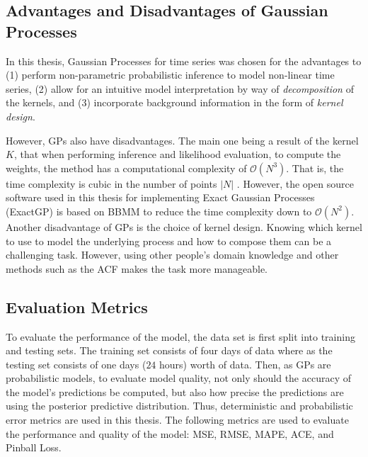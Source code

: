 \subsection{Advantages and Disadvantages of Gaussian Processes}

In this thesis, Gaussian Processes for time series was chosen for the advantages to (1) perform non-parametric probabilistic inference to model non-linear time series, (2) allow for an intuitive model interpretation by way of \textit{decomposition} of the kernels, and (3) incorporate background information in the form of \textit{kernel design}.

However, GPs also have disadvantages. The main one being a result of the kernel $K$, that when performing inference and likelihood evaluation, to compute the weights, the method has a computational complexity of $\mathcal{O}(N^3)$. That is, the time complexity is cubic in the number of points $|N|$ \cite{pml1Book}. However, the open source software used in this thesis \cite{gardner2018gpytorch} for implementing Exact Gaussian Processes (ExactGP) is based on \ac{BBMM} \cite{NEURIPS2018_27e8e171} to reduce the time complexity down to $\mathcal{O}(N^2)$. Another disadvantage of GPs is the choice of kernel design. Knowing which kernel to use to model the underlying process and how to compose them can be a challenging task. However, using other people's domain knowledge and other methods such as the ACF makes the task more manageable. 

\subsection{Evaluation Metrics}

To evaluate the performance of the model, the data set is first split into training and testing sets. The training set consists of four days of data where as the testing set consists of one days ($24$ hours) worth of data. Then, as GPs are probabilistic models, to evaluate model quality, not only should the accuracy of the model's predictions be computed, but also how precise the predictions are using the posterior predictive distribution. Thus, deterministic and probabilistic error metrics are used in this thesis. The following metrics are used to evaluate the performance and quality of the model:  \ac{MSE}, RMSE, \ac{MAPE}, \ac{ACE}, and Pinball Loss.

